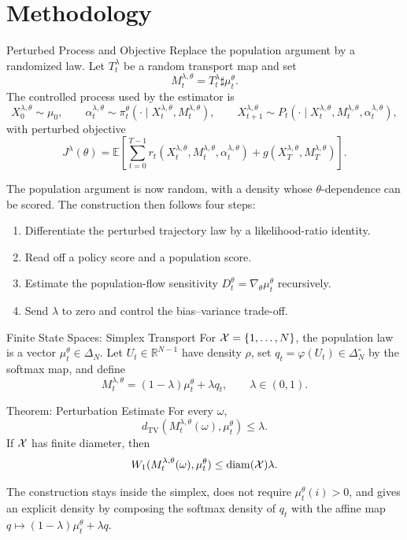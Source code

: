 \documentclass[9pt]{beamer}
\def\Xc{{\cal X}}
\def\E{{\mathbb E}}
\def\R{{\mathbb R}}
\begin{document}
\section{Methodology}

\begin{frame}{Perturbed Process and Objective}
\small
Replace the population argument by a randomized law. Let $T_t^\lambda$ be a random transport map and set
\[
  M_t^{\lambda,\theta}=T_t^\lambda\sharp\mu_t^\theta .
\]
The controlled process used by the estimator is
\[
  X_0^{\lambda,\theta}\sim\mu_0,\qquad
  \alpha_t^{\lambda,\theta}\sim\pi_t^\theta(\cdot\mid X_t^{\lambda,\theta},M_t^{\lambda,\theta}),\qquad
  X_{t+1}^{\lambda,\theta}\sim P_t(\cdot\mid X_t^{\lambda,\theta},M_t^{\lambda,\theta},\alpha_t^{\lambda,\theta}),
\]
with perturbed objective
\[
  J^\lambda(\theta)=
  \E\!\left[
    \sum_{t=0}^{T-1}
    r_t(X_t^{\lambda,\theta},M_t^{\lambda,\theta},\alpha_t^{\lambda,\theta})
    +g(X_T^{\lambda,\theta},M_T^{\lambda,\theta})
  \right].
\]

\vspace{0.15cm}
The population argument is now random, with a density whose $\theta$-dependence can be scored. The construction then follows four steps:

\vspace{0.1cm}
\begin{enumerate}
  \item Differentiate the perturbed trajectory law by a likelihood-ratio identity.
  \item Read off a policy score and a population score.
  \item Estimate the population-flow sensitivity $D_t^\theta=\nabla_\theta\mu_t^\theta$ recursively.
  \item Send $\lambda$ to zero and control the bias--variance trade-off.
\end{enumerate}
\end{frame}

\begin{frame}{Finite State Spaces: Simplex Transport}
\small
For $\Xc=\{1,\ldots,N\}$, the population law is a vector $\mu_t^\theta\in\Delta_N$.
Let $U_t\in\R^{N-1}$ have density $\rho$, set $q_t=\varphi(U_t)\in\Delta_N^\circ$ by the softmax map, and define
\[
  M_t^{\lambda,\theta}
  =
  (1-\lambda)\mu_t^\theta+\lambda q_t,
  \qquad \lambda\in(0,1).
\]

\begin{block}{Theorem: Perturbation Estimate}
For every $\omega$,
\[
  d_{\mathrm{TV}}(M_t^{\lambda,\theta}(\omega),\mu_t^\theta)\leq\lambda.
\]
If $\Xc$ has finite diameter, then
\[
  W_1(M_t^{\lambda,\theta}(\omega),\mu_t^\theta)
  \leq \operatorname{diam}(\Xc)\lambda.
\]
\end{block}

\vspace{0.05cm}
The construction stays inside the simplex, does not require $\mu_t^\theta(i)>0$, and gives an explicit density by composing the softmax density of $q_t$ with the affine map $q\mapsto(1-\lambda)\mu_t^\theta+\lambda q$.
\end{frame}
\end{document}

